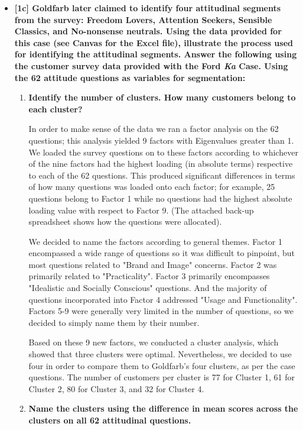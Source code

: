 \documentclass[10pt, oneside,spanish]{article}
\begin{document}
\begin{itemize}
\item \textbf{[1c] Goldfarb later claimed to identify four attitudinal segments from the survey: Freedom Lovers, Attention Seekers, Sensible Classics, and No-nonsense neutrals.  Using the data provided for this case (see Canvas for the Excel file), illustrate the process used for identifying the attitudinal segments. Answer the following using the customer survey data provided with the Ford \textit{Ka} Case. Using the 62 attitude questions as variables for segmentation:  }
	\begin{enumerate}
    \item \textbf{Identify the number of clusters.  How many customers belong to each cluster?}
    
   In order to make sense of the data we ran a factor analysis on the 62 questions; this analysis yielded 9 factors with Eigenvalues greater than 1. We loaded the survey questions on to these factors according to whichever of the nine factors had the highest loading (in absolute terms) respective to each of the 62 questions. This produced significant differences in terms of how many questions was loaded onto each factor; for example, 25 questions belong to Factor 1 while no questions had the highest absolute loading value with respect to Factor 9. (The attached back-up spreadsheet shows how the questions were allocated). 
   
   We decided to name the factors according to general themes. Factor 1 encompassed a wide range of questions so it was difficult to pinpoint, but most questions related to "Brand and Image" concerns. Factor 2 was primarily related to "Practicality". Factor 3 primarily encompasses "Idealistic and Socially Conscious" questions. And the majority of questions incorporated into Factor 4 addressed "Usage and Functionality". Factors 5-9 were generally very limited in the number of questions, so we decided to simply name them by their number.
   
   Based on these 9 new factors, we conducted a cluster analysis, which showed that three clusters were optimal. Nevertheless, we decided to use four in order to compare them to Goldfarb's four clusters, as per the case questions.  The number of customers per cluster is 77 for Cluster 1, 61 for Cluster 2, 80 for Cluster 3, and 32 for Cluster 4.
    
\pagebreak  
\item \textbf{Name the clusters using the difference in mean scores across the clusters on all 62 attitudinal questions.}
    

\end{enumerate}
\end{itemize}
\end{document}

